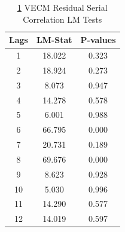 \documentclass{beamer}
\begin{document}
	\begin{frame}
		\begin{table}
			\caption{ \ref{table:residual_corr_test} VECM Residual Serial Correlation LM Tests}
			\label{table:residual_corr_test}
			
			\begin{tabular}{ccc}
				\toprule
				Lags & LM-Stat  & P-values \\
				\midrule
				
				1     & 18.022   & 0.323 \\
				2     & 18.924   & 0.273 \\
				3     & 8.073    & 0.947 \\
				4     & 14.278   & 0.578 \\
				5     & 6.001    & 0.988 \\
				6     & 66.795   & 0.000 \\
				7     & 20.731   & 0.189 \\
				8     & 69.676   & 0.000 \\
				9     & 8.623    & 0.928 \\
				10    & 5.030    & 0.996 \\
				11    & 14.290   & 0.577 \\
				12    & 14.019   & 0.597 \\
				
				\bottomrule
			\end{tabular}
		\end{table}
		
		
	\end{frame}
\end{document}

